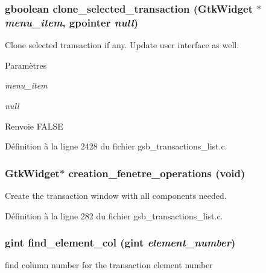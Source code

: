 \subsubsection[{clone\_\-selected\_\-transaction}]{\setlength{\rightskip}{0pt plus 5cm}gboolean clone\_\-selected\_\-transaction (GtkWidget $\ast$ {\em menu\_\-item}, \/  gpointer {\em null})}\label{gsb__transactions__list_8h_a8da0807401b34e59349e9534ed0e9cd9}
Clone selected transaction if any. Update user interface as well.


\begin{DoxyParams}{Paramètres}
\item[{\em menu\_\-item}]\item[{\em null}]\end{DoxyParams}
\begin{DoxyReturn}{Renvoie}
FALSE 
\end{DoxyReturn}


Définition à la ligne 2428 du fichier gsb\_\-transactions\_\-list.c.

\subsubsection[{creation\_\-fenetre\_\-operations}]{\setlength{\rightskip}{0pt plus 5cm}GtkWidget$\ast$ creation\_\-fenetre\_\-operations (void)}\label{gsb__transactions__list_8h_a750143785ed9e62525a92754c8262f55}
Create the transaction window with all components needed. 

Définition à la ligne 282 du fichier gsb\_\-transactions\_\-list.c.

\subsubsection[{find\_\-element\_\-col}]{\setlength{\rightskip}{0pt plus 5cm}gint find\_\-element\_\-col (gint {\em element\_\-number})}\label{gsb__transactions__list_8h_a8be7f66c4c8f7c67eb187290c18fb6f7}
find column number for the transaction element number


